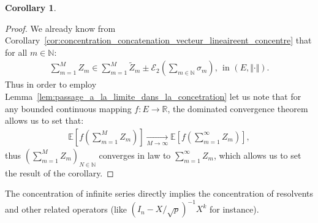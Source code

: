 \documentclass{ws-rmta}
\newcounter{ccorollary}
\newtheorem{corollaire}[ccorollary]{Corollary}
\begin{document}
\begin{corollaire}\label{cor:concentration_serie_vecteur_lineairement_concentres}
\end{corollaire}
\begin{proof}
  We already know from Corollary~\ref{cor:concentration_concatenation_vecteur_lineaireent_concentre} that for all $m \in \mathbb N$:
  \begin{align*}
    \sum_{m = 1}^M Z_m \in \sum_{m = 1}^M \tilde Z_m \pm \mathcal E_2 \left(\sum_{m \in \mathbb N} \sigma_m\right),
     \ \ \text{in } (E, \Vert \cdot \Vert).
  \end{align*}
  Thus in order to employ Lemma~\ref{lem:passage_a_la_limite_dans_la_concetration} let us note that for any bounded continuous mapping $f:E \to \mathbb R$, the dominated convergence theorem allows us to set that:
  \begin{align*}
    \mathbb E \left[ f \left(\sum_{m = 1}^M Z_m \right)\right] \underset{M \to \infty} \longrightarrow \mathbb E \left[ f \left(\sum_{m = 1}^\infty Z_m \right)\right],
  \end{align*}
  thus $(\sum_{m = 1}^M Z_m)_{N \in \mathbb N}$ converges in law to $\sum_{m = 1}^\infty Z_m$, which allows us to set the result of the corollary.

\end{proof}
The concentration of infinite series directly implies the concentration of resolvents and other related operators (like $(I_n - X/\sqrt p)^{-1} X^k$ for instance). 
\end{document}

